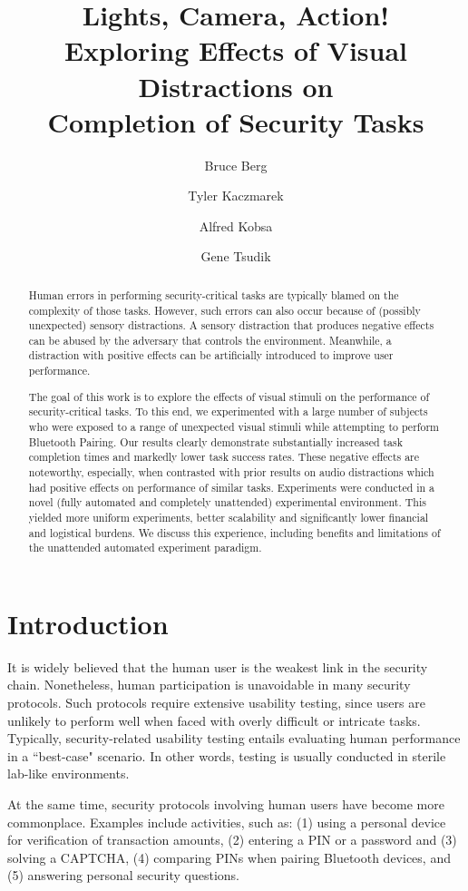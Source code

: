 \documentclass{llncs}
\title{Lights, Camera, Action! \\  Exploring Effects of Visual Distractions on \\  Completion of Security Tasks}
\author{Bruce Berg 
\and Tyler Kaczmarek
\and Alfred Kobsa 
\and Gene Tsudik \\}
\institute{University of California Irvine, Irvine, CA, USA \\ \email{bgberg@uci.edu \\
tkaczmar@uci.edu\\kobsa@uci.edi\\gts@ics.uci.edu}}
\begin{document}
\maketitle

\begin{abstract}
%
Human errors in performing security-critical tasks are typically blamed on the
complexity of those tasks. However, such errors can also occur because of (possibly
unexpected) sensory distractions. A sensory distraction that produces negative effects
can be abused by the adversary that controls the environment. Meanwhile, a 
distraction with positive effects can be artificially introduced to improve user performance.

The goal of this work is to explore the effects of visual stimuli on the performance of security-critical tasks. To this end,
we experimented with a large number of subjects who were exposed to a
range of unexpected visual stimuli while attempting to perform Bluetooth Pairing. Our results clearly demonstrate substantially increased task completion times
and markedly lower task success rates. These negative effects are noteworthy,
especially, when contrasted with prior results on audio distractions which had
positive effects on performance of similar tasks.
Experiments were conducted in a novel (fully automated and completely unattended) experimental
environment. This yielded more uniform experiments, better scalability and
significantly lower financial and logistical burdens. We discuss this experience, including
benefits and limitations of the unattended automated experiment paradigm.
%
\end{abstract}


\section{Introduction}
\label{sec:intro}
%
It is widely believed that the human user is the weakest link in the security chain. 
Nonetheless,  human participation is unavoidable in many security protocols. Such
protocols require extensive usability testing, since users are unlikely to perform well when 
faced with overly difficult or intricate tasks. Typically, security-related usability testing 
entails evaluating human performance in a ``best-case" scenario. In other words, testing 
is usually conducted in sterile lab-like environments. 

At the same time, security protocols involving human users have become more commonplace. 
Examples include activities, such as: (1) using a personal device for verification 
of transaction amounts, (2) entering a PIN or a password and (3) solving a CAPTCHA,  
(4) comparing PINs when pairing Bluetooth devices, and (5) answering personal security 
questions. %
\end{document}
